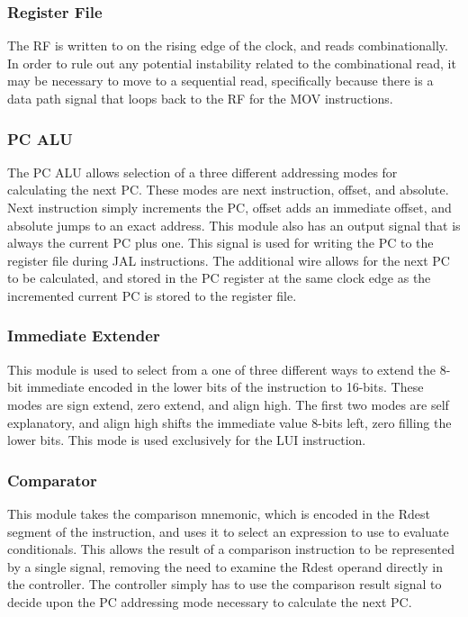 \documentclass[10pt, portrait, letterpaper]{article}
\begin{document}
  \subsubsection{Register File}
  The RF is written to on the rising edge of the clock, and reads combinationally.
  In order to rule out any potential instability related to the combinational 
  read, it may be necessary to move to a sequential read, specifically because 
  there is a data path signal that loops back to the RF for the MOV instructions.

  \subsubsection{PC ALU}
  The PC ALU allows selection of a three different addressing modes for calculating the next PC. 
  These modes are next instruction, offset, and absolute. 
  Next instruction simply increments the PC, offset adds an immediate offset, and absolute 
  jumps to an exact address.
  This module also has an output signal that is always the current PC plus one. 
  This signal is used for writing the PC to the register file during JAL instructions. 
  The additional wire allows for the next PC to be calculated, and stored in the PC register 
  at the same clock edge as the incremented current PC is stored to the register file.

  \subsubsection{Immediate Extender} 
  This module is used to select from a one of three different ways to extend 
  the 8-bit immediate encoded in the lower bits of the instruction to 16-bits.
  These modes are sign extend, zero extend, and align high. 
  The first two modes are self explanatory, and align high shifts the immediate 
  value 8-bits left, zero filling the lower bits. 
  This mode is used exclusively for the LUI instruction.

  \subsubsection{Comparator} 
  This module takes the comparison mnemonic, which is encoded in the Rdest segment of the 
  instruction, and uses it to select an expression to use to evaluate conditionals. 
  This allows the result of a comparison instruction to be represented by a single signal, 
  removing the need to examine the Rdest operand directly in the controller. 
  The controller simply has to use the comparison result signal to decide upon 
  the PC addressing mode necessary to calculate the next PC.
\end{document}
